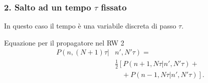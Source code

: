 \subsubsection{2. Salto ad un tempo $\tau$ fissato}%
\label{subsub:2. Salto ad un tempo tau fissato}
In questo caso il tempo è una variabile discreta di passo $\tau$.
\begin{bluebox}{Equazione per il propagatore nel RW 2}
\begin{equation}
\begin{aligned}
    P\left(n,(N+1) \tau|\right.&\left.n',N'\tau\right)= \\
			       &\frac{1}{2}\left[P\left(n+1,N\tau|n',N'\tau\right)\right. + \\
			       & \quad + \left.  P\left(n-1,N\tau|n',N'\tau\right)\right] \label{eq:6_1}
.\end{aligned}
\end{equation}
    
\end{bluebox}
\noindent

